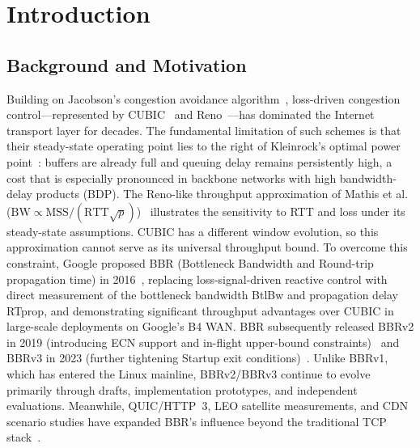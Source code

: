 \documentclass[a4paper,fleqn]{cas-sc}
\begin{document}
\maketitle

\section{Introduction}
\label{sec:intro}

\subsection{Background and Motivation}
\label{sec:background}

Building on Jacobson's congestion avoidance algorithm~\citep{jacobson1988congestion},
loss-driven congestion control---represented by CUBIC~\citep{ha2008cubic} and
Reno~\citep{fall1996simulation}---has dominated the Internet transport layer for
decades. The fundamental limitation of such schemes is that their steady-state
operating point lies to the right of Kleinrock's optimal power
point~\citep{kleinrock1979power}: buffers are already full and queuing delay
remains persistently high, a cost that is especially pronounced in backbone
networks with high bandwidth-delay products (BDP). The Reno-like throughput approximation of Mathis et al.
($\mathrm{BW}\propto\mathrm{MSS}/(\mathrm{RTT}\sqrt{p})$)~\citep{mathis1997macroscopic}
illustrates the sensitivity to RTT and loss under its steady-state assumptions.
CUBIC has a different window evolution, so this approximation cannot serve
as its universal throughput bound.
To overcome this constraint, Google proposed BBR (Bottleneck Bandwidth and
Round-trip propagation time) in 2016~\citep{cardwell2017bbr}, replacing
loss-signal-driven reactive control with direct measurement of the bottleneck
bandwidth BtlBw and propagation delay RTprop, and demonstrating significant
throughput advantages over CUBIC in large-scale deployments on Google's B4 WAN.
BBR subsequently released BBRv2 in 2019 (introducing ECN support and in-flight
upper-bound constraints)~\citep{cardwell2019bbrv2} and BBRv3 in 2023 (further
tightening Startup exit conditions)~\citep{cardwell2023bbrv3}. Unlike BBRv1,
which has entered the Linux mainline, BBRv2/BBRv3 continue to evolve primarily
through drafts, implementation prototypes, and independent evaluations. Meanwhile,
QUIC/HTTP~3, LEO satellite measurements, and CDN scenario studies have expanded
BBR's influence beyond the traditional TCP
stack~\citep{rfc9000,rfc9002,rfc9114,deutschmann2023starlink,kamel2024starquic}.
\end{document}
